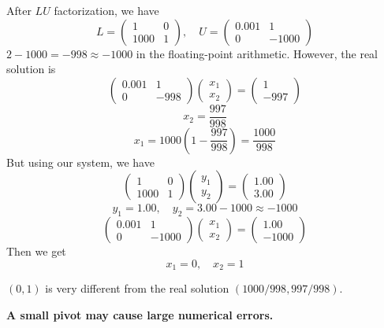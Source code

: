 After $LU$ factorization, we have \[
    L = \begin{pmatrix}
        1 & 0 \\
        1000 & 1
    \end{pmatrix}, \quad U = \begin{pmatrix}
        0.001 & 1 \\
        0 & -1000
    \end{pmatrix}
\]
$2-1000 = -998 \approx -1000$ in the floating-point arithmetic. However, the real solution is \[
    \begin{pmatrix}
        0.001 & 1 \\
        0 & -998
    \end{pmatrix} \begin{pmatrix}
        x_1 \\ x_2
    \end{pmatrix} = \begin{pmatrix}
        1\\ -997
    \end{pmatrix}
\]
\[
    x_2 = \frac{997}{998}
\]
\[
    x_1 = 1000(1- \frac{997}{998}) = \frac{1000}{998}
\]
But using our system, we have \[
    \begin{pmatrix}
        1 & 0 \\
        1000 & 1
    \end{pmatrix} \begin{pmatrix}
        y_1 \\ y_2
    \end{pmatrix} = \begin{pmatrix}
        1.00\\ 3.00
    \end{pmatrix}
\]
\[
    y_1 = 1.00, \quad y_2 = 3.00 - 1000 \approx -1000
\]
\[
    \begin{pmatrix}
        0.001 & 1 \\
        0 & -1000
    \end{pmatrix} \begin{pmatrix}
        x_1 \\ x_2
    \end{pmatrix} = \begin{pmatrix}
        1.00\\ -1000
    \end{pmatrix} \tag{2.1.1}
\]
Then we get
\[
    x_1 = 0, \quad x_2 = 1
\]

$(0,1)$ is very different from the real solution $(1000/998, 997/998)$.

\begin{remark}
    \textbf{A small pivot may cause large numerical errors.}
\end{remark}

